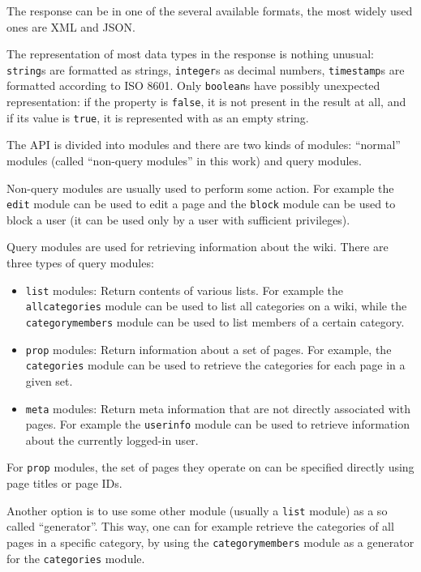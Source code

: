 The response can be in one of the several available formats, the most widely used ones are XML and JSON.

The representation of most data types in the response is nothing unusual:
\texttt{string}s are formatted as strings, \texttt{integer}s as decimal numbers,
\texttt{timestamp}s are formatted according to ISO 8601.
Only \texttt{boolean}s have possibly unexpected representation:
if the property is \texttt{false}, it is not present in the result at all,
and if its value is \texttt{true}, it is represented with as an empty string.

The API is divided into modules and there are two kinds of modules:
“normal” modules (called “non-query modules” in this work) and query modules.

Non-query modules are usually used to perform some action.
For example the \texttt{edit} module can be used to edit a page
and the \texttt{block} module can be used to block a user (it can be used only by a user with sufficient privileges).

Query modules are used for retrieving information about the wiki. There are three types of query modules:

\begin{itemize}
\item \texttt{list} modules: Return contents of various lists.
For example the \texttt{allcategories} module can be used to list all categories on a wiki,
while the \texttt{categorymembers} module can be used to list members of a certain category.
\item \texttt{prop} modules: Return information about a set of pages.
For example, the \texttt{categories} module can be used to retrieve the categories for each page in a given set.
\item \texttt{meta} modules: Return meta information that are not directly associated with pages.
For example the \texttt{userinfo} module can be used to retrieve information about the currently logged-in user.
\end{itemize}

For \texttt{prop} modules, the set of pages they operate on can be specified directly using page titles or page IDs.

Another option is to use some other module (usually a \texttt{list} module) as a so called “generator”.
This way, one can for example retrieve the categories of all pages in a specific category,
by using the \texttt{categorymembers} module as a generator for the \texttt{categories} module.

